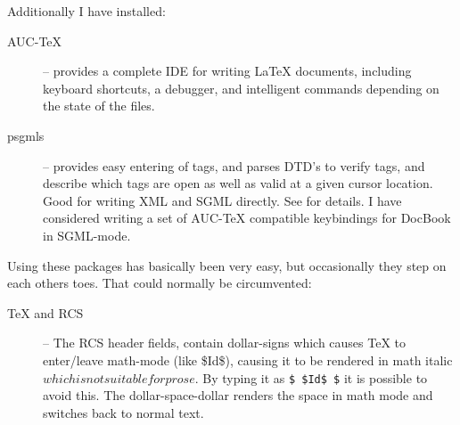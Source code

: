 Additionally I have installed:


\begin{description}
\item[AUC-TeX] -- provides a complete IDE for writing {\LaTeX}
  documents, including keyboard shortcuts, a debugger, and intelligent
  commands depending on the state of the files. 
  
\item[psgmls] -- provides easy entering of tags, and parses DTD's to
  verify tags, and describe which tags are open as well as valid at a
  given cursor location.  Good for writing XML and SGML directly.  See
   for details.  I have considered writing a set of
  AUC-TeX compatible keybindings for DocBook in SGML-mode.
\end{description}



Using these packages has basically been very easy, but occasionally
they step on each others toes.  That could normally be circumvented:

\begin{description}
\item[{\TeX} and RCS] -- The RCS header fields, contain dollar-signs
  which causes {\TeX} to enter/leave math-mode (like
  \mbox{\$I}\mbox{d\$}), causing it to be rendered in math italic
  $which is not suitable for prose$.  By typing it as \texttt{\$
    \${}Id\$ \$} it is possible to avoid this. The dollar-space-dollar
  renders the space in math mode and switches back to normal text.
\end{description}

